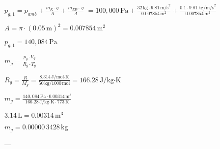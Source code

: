 \( p_{g,1} = p_{amb} + \frac{m_K \cdot g}{A} + \frac{m_{EW} \cdot g}{A} \)  
\( = 100,000 \, \text{Pa} + \frac{32 \, \text{kg} \cdot 9.81 \, \text{m/s}^2}{0.007854 \, \text{m}^2} + \frac{0.1 \cdot 9.81 \, \text{kg/m/s}^2}{0.007854 \, \text{m}^2} \)  

\( A = \pi \cdot (0.05 \, \text{m})^2 = 0.007854 \, \text{m}^2 \)  

\( p_{g,1} = 140,084 \, \text{Pa} \)  

\( m_g = \frac{p_g \cdot V_g}{R_g \cdot T_g} \)  

\( R_g = \frac{R}{M_g} = \frac{8.314 \, \text{J/mol·K}}{50 \, \text{kg}/1000 \, \text{mol}} = 166.28 \, \text{J/kg·K} \)  

\( m_g = \frac{140,084 \, \text{Pa} \cdot 0.00314 \, \text{m}^3}{166.28 \, \text{J/kg·K} \cdot 773 \, \text{K}} \)  

\( 3.14 \, \text{L} = 0.00314 \, \text{m}^3 \)  

\( m_g = 0.00000 \, 3428 \, \text{kg} \)  

---